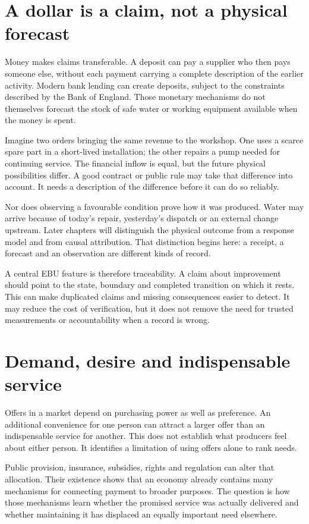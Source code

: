 \section{A dollar is a claim, not a physical forecast}
Money makes claims transferable. A deposit can pay a supplier who then pays someone else, without each payment carrying a complete description of the earlier activity. Modern bank lending can create deposits, subject to the constraints described by the Bank of England.\cite{intro-boe} Those monetary mechanisms do not themselves forecast the stock of safe water or working equipment available when the money is spent.

Imagine two orders bringing the same revenue to the workshop. One uses a scarce spare part in a short-lived installation; the other repairs a pump needed for continuing service. The financial inflow is equal, but the future physical possibilities differ. A good contract or public rule may take that difference into account. It needs a description of the difference before it can do so reliably.

Nor does observing a favourable condition prove how it was produced. Water may arrive because of today's repair, yesterday's dispatch or an external change upstream. Later chapters will distinguish the physical outcome from a response model and from causal attribution. That distinction begins here: a receipt, a forecast and an observation are different kinds of record.

A central EBU feature is therefore traceability. A claim about improvement should point to the state, boundary and completed transition on which it rests. This can make duplicated claims and missing consequences easier to detect. It may reduce the cost of verification, but it does not remove the need for trusted measurements or accountability when a record is wrong.

\section{Demand, desire and indispensable service}
Offers in a market depend on purchasing power as well as preference. An additional convenience for one person can attract a larger offer than an indispensable service for another. This does not establish what producers feel about either person. It identifies a limitation of using offers alone to rank needs.

Public provision, insurance, subsidies, rights and regulation can alter that allocation. Their existence shows that an economy already contains many mechanisms for connecting payment to broader purposes. The question is how those mechanisms learn whether the promised service was actually delivered and whether maintaining it has displaced an equally important need elsewhere.

